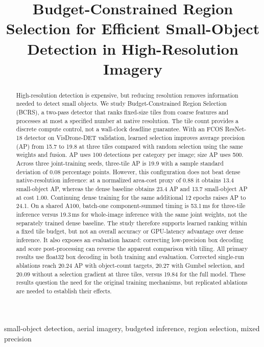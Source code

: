 \documentclass[conference]{IEEEtran}
\begin{document}
\title{Budget-Constrained Region Selection for Efficient Small-Object Detection in High-Resolution Imagery}
\author{
}
\maketitle

\begin{abstract}
High-resolution detection is expensive, but reducing resolution removes information needed to detect small objects. We study Budget-Constrained Region Selection (BCRS), a two-pass detector that ranks fixed-size tiles from coarse features and processes at most a specified number at native resolution. The tile count provides a discrete compute control, not a wall-clock deadline guarantee. With an FCOS ResNet-18 detector on VisDrone-DET validation, learned selection improves average precision (AP) from 15.7 to 19.8 at three tiles compared with random selection using the same weights and fusion. AP uses 100 detections per category per image; size AP uses 500. Across three joint-training seeds, three-tile AP is 19.9 with a sample standard deviation of 0.08 percentage points. However, this configuration does not beat dense native-resolution inference: at a normalized area-cost proxy of 0.88 it obtains 13.4 small-object AP, whereas the dense baseline obtains 23.4 AP and 13.7 small-object AP at cost 1.00. Continuing dense training for the same additional 12 epochs raises AP to 24.1. On a shared A100, batch-one component-summed timing is 53.1\,ms for three-tile inference versus 19.3\,ms for whole-image inference with the same joint weights, not the separately trained dense baseline. The study therefore supports learned ranking within a fixed tile budget, but not an overall accuracy or GPU-latency advantage over dense inference. It also exposes an evaluation hazard: correcting low-precision box decoding and score post-processing can reverse the apparent comparison with tiling. All primary results use float32 box decoding in both training and evaluation. Corrected single-run ablations reach 20.24 AP with object-count targets, 20.27 with Gumbel selection, and 20.09 without a selection gradient at three tiles, versus 19.84 for the full model. These results question the need for the original training mechanisms, but replicated ablations are needed to establish their effects.
\end{abstract}

\begin{IEEEkeywords}
small-object detection, aerial imagery, budgeted inference, region selection, mixed precision
\end{IEEEkeywords}
\end{document}
